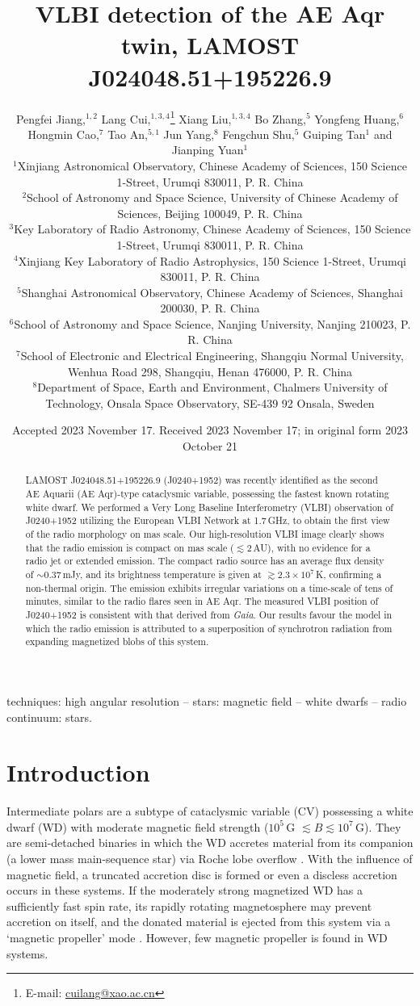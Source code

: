 \documentclass[fleqn,usenatbib]{mnras}
\title[VLBI detection of J0240+1952]{VLBI detection of the AE Aqr twin, LAMOST J024048.51+195226.9}
\author[P.-F. Jiang et al.]{Pengfei Jiang,$^{1,2}$
Lang Cui,$^{1,3,4}$\thanks{E-mail: \href{cuilang:cuilang@xao.ac.cn}{cuilang@xao.ac.cn}}
Xiang Liu,$^{1,3,4}$
Bo Zhang,$^{5}$
Yongfeng Huang,$^{6}$
Hongmin Cao,$^{7}$
\newauthor Tao An,$^{5,1}$
Jun Yang,$^{8}$
Fengchun Shu,$^{5}$
Guiping Tan$^{1}$
and Jianping Yuan$^{1}$
\\
$^{1}$Xinjiang Astronomical Observatory, Chinese Academy of Sciences, 150 Science 1-Street, Urumqi 830011, P. R. China\\
$^{2}$School of Astronomy and Space Science, University of Chinese Academy of Sciences, Beijing 100049, P. R. China\\
$^{3}$Key Laboratory of Radio Astronomy, Chinese Academy of Sciences, 150 Science 1-Street, Urumqi 830011, P. R. China\\
$^{4}$Xinjiang Key Laboratory of Radio Astrophysics, 150 Science 1-Street, Urumqi 830011, P. R. China\\
$^{5}$Shanghai Astronomical Observatory, Chinese Academy of Sciences, Shanghai 200030, P. R. China\\
$^{6}$School of Astronomy and Space Science, Nanjing University, Nanjing 210023, P. R. China\\
$^{7}$School of Electronic and Electrical Engineering, Shangqiu Normal University, Wenhua Road 298, Shangqiu, Henan 476000, P. R. China\\
$^{8}$Department of Space, Earth and Environment, Chalmers University of Technology, Onsala Space Observatory, SE-439 92 Onsala, Sweden
}
\date{Accepted 2023 November 17. Received 2023 November 17; in original form 2023 October 21}
\begin{document}
\label{firstpage}
\pagerange{\pageref{firstpage}--\pageref{lastpage}}
\maketitle

\begin{abstract}
LAMOST J024048.51+195226.9 (J0240+1952) was recently identified as the second AE Aquarii (AE Aqr)-type cataclysmic variable, possessing the fastest known rotating white dwarf. We performed a Very Long Baseline Interferometry (VLBI) observation of J0240+1952 utilizing the European VLBI Network at 1.7\,GHz, to obtain the first view of the radio morphology on mas scale. Our high-resolution VLBI image clearly shows that the radio emission is compact on mas scale ($\lesssim2$\,AU), with no evidence for a radio jet or extended emission. The compact radio source has an average flux density of $\sim0.37$\,mJy, and its brightness temperature is given at $\gtrsim2.3\times10^{7}$\,K, confirming a non-thermal origin. The emission exhibits irregular variations on a time-scale of tens of minutes, similar to the radio flares seen in AE Aqr. The measured VLBI position of J0240+1952 is consistent with that derived from \textit{Gaia}. Our results favour the model in which the radio emission is attributed to a superposition of synchrotron radiation from expanding magnetized blobs of this system.
\end{abstract}

\begin{keywords}
techniques: high angular resolution -- stars: magnetic field -- white dwarfs -- radio continuum: stars.
\end{keywords}



\section{Introduction}

Intermediate polars \citep[e.g.][]{Patterson1994} are a subtype of cataclysmic variable (CV) possessing a white dwarf (WD) with moderate magnetic field strength ($10^{5}$\,G $\lesssim B \lesssim10^{7}$\,G). They are semi-detached binaries in which the WD accretes material from its companion (a lower mass main-sequence star) via Roche lobe overflow \citep{Warner1995}. With the influence of magnetic field, a truncated accretion disc is formed or even a discless accretion \citep{Buckley1995} occurs in these systems. If the moderately strong magnetized WD has a sufficiently fast spin rate, its rapidly rotating magnetosphere may prevent accretion on itself, and the donated material is ejected from this system via a `magnetic propeller' mode \citep{Wynn1995,Eracleous1996,Wynn1997}. However, few magnetic propeller is found in WD systems.
\end{document}
